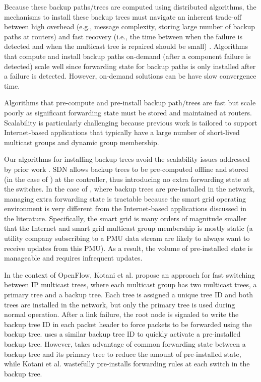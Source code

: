 Because these backup paths/trees are computed using distributed algorithms, the mechanisms to install these backup trees must navigate an inherent trade-off between high overhead
(e.g., message complexity, storing large number of backup paths at routers) and fast recovery (i.e., the time between when the failure is detected and when the multicast tree is repaired
should be small) \cite{Cui04}.  Algorithms that compute and install backup paths on-demand (after a component failure is detected) scale well since forwarding state for backup paths is only
installed after a failure is detected.  However, on-demand solutions can be have slow convergence time. %

Algorithms that pre-compute and pre-install backup path/trees are fast but scale poorly as significant forwarding state must be stored and maintained at routers. 
Scalability is particularly challenging because previous work  \cite{Cui04,Fei01,Kodialam02,Lau05,Li06,Luebben09,Medard99,Pointurier02,Wu97} is tailored to support Internet-based applications that 
typically have a large number of short-lived multicast groups and dynamic group membership. %

Our algorithms for installing backup trees avoid the scalability issues addressed by prior work \cite{Cui04,Fei01,Medard99}.  SDN allows backup trees to be pre-computed offline and stored (in the
case of \posts) at the controller, thus introducing no extra forwarding state at the switches.  In the case of \pres, where backup trees are pre-installed in the network, managing
extra forwarding state is tractable because the smart grid operating environment is very different from the Internet-based applications discussed in the literature.  
Specifically, the smart grid is many orders of magnitude smaller that the Internet and smart grid multicast group membership is mostly static \cite{Bakken11}
(a utility company subscribing to a PMU data stream are likely to always want to receive updates from this PMU).  As a result, the volume of pre-installed state is manageable and 
requires infrequent updates.

In the context of OpenFlow, Kotani et al. \cite{Kotani12} propose an approach for fast switching between IP multicast trees, where 
each multicast group has two multicast trees, a primary tree and a backup tree.  
Each tree is assigned a unique tree ID and both trees are installed in the network, but only the primary tree is used during normal operation.  
After a link failure, the root node is signaled to write the backup tree ID in each packet header to force packets to be forwarded using the backup tree.  \pre uses a similar 
backup tree ID to quickly activate a pre-installed backup tree.  However, \pre takes advantage of common forwarding state between a backup tree and its primary tree to reduce
the amount of pre-installed state, while Kotani et al. \cite{Kotani12} wastefully pre-installs forwarding rules at each switch in the backup tree.  


